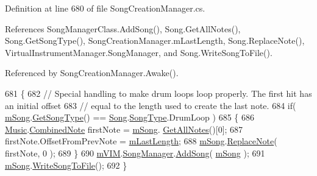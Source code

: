 Definition at line 680 of file Song\+Creation\+Manager.\+cs.



References Song\+Manager\+Class.\+Add\+Song(), Song.\+Get\+All\+Notes(), Song.\+Get\+Song\+Type(), Song\+Creation\+Manager.\+m\+Last\+Length, Song.\+Replace\+Note(), Virtual\+Instrument\+Manager.\+Song\+Manager, and Song.\+Write\+Song\+To\+File().



Referenced by Song\+Creation\+Manager.\+Awake().


\begin{DoxyCode}
681     \{
682         \textcolor{comment}{// Special handling to make drum loops loop properly. The first hit has an initial offset}
683         \textcolor{comment}{// equal to the length used to create the last note.}
684         \textcolor{keywordflow}{if}( \hyperlink{group___s_c_m_priv_var_gabd8329149faef65a689650d951a9abc9}{mSong}.\hyperlink{group___song_pub_func_gabae5b5d8f727b2d9da7867a99347f86b}{GetSongType}() == \hyperlink{class_song}{Song}.\hyperlink{group___song_enums_gae681a1f001333e39fc1cb4fea97bfe1b}{SongType}.DrumLoop )
685         \{
686             \hyperlink{class_music}{Music}.\hyperlink{group___music_structs_struct_music_1_1_combined_note}{CombinedNote} firstNote = \hyperlink{group___s_c_m_priv_var_gabd8329149faef65a689650d951a9abc9}{mSong}.
      \hyperlink{group___song_pub_func_ga842675b7691fca074ee394031afc7675}{GetAllNotes}()[0];
687             firstNote.OffsetFromPrevNote = \hyperlink{group___s_c_m_priv_var_gaa137adb1c99e9ee59adcfbf7d0cf6249}{mLastLength};
688             \hyperlink{group___s_c_m_priv_var_gabd8329149faef65a689650d951a9abc9}{mSong}.\hyperlink{group___song_pub_func_ga326d61c75339080057a02c6decb0cde3}{ReplaceNote}( firstNote, 0 );
689         \}
690         \hyperlink{group___s_c_m_priv_var_ga7822ac42d20a4577db66808f000decfb}{mVIM}.\hyperlink{group___v_i_m_pub_ga33dae94932c10c66db76a0eebec76b01}{SongManager}.\hyperlink{group___s_m_pub_func_ga1a228cb2a64e55448ccf9d1d618f05b7}{AddSong}( \hyperlink{group___s_c_m_priv_var_gabd8329149faef65a689650d951a9abc9}{mSong} );
691         \hyperlink{group___s_c_m_priv_var_gabd8329149faef65a689650d951a9abc9}{mSong}.\hyperlink{group___song_pub_func_ga70b0f6021c3b0590c561a88e3d1e5c2f}{WriteSongToFile}();
692     \}
\end{DoxyCode}
\mbox{\label{group___s_c_m_handlers_ga45e79bb31be34e3e2cc47bd6a6563b40}} 
